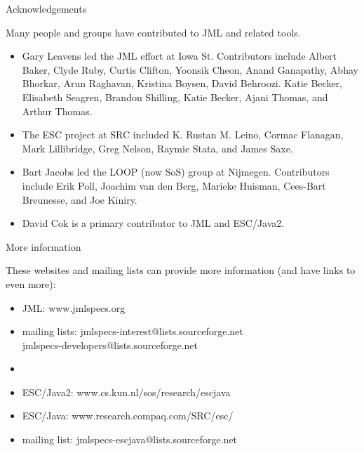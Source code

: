 \documentclass[
pdf,
nocolorBG,
slideColor,
erik,
]{prosper}
\begin{document}
\begin{slide}{Acknowledgements}

\vspace*{-2ex}
Many people and groups have contributed to JML and related tools.

\begin{itemize}
\item {\scriptsize Gary Leavens led the JML effort at Iowa St.
    Contributors include Albert Baker, Clyde Ruby, Curtis
    Clifton, Yoonsik Cheon, Anand Ganapathy, Abhay Bhorkar, Arun
    Raghavan, Kristina Boysen, David Behroozi. Katie Becker, Elisabeth
    Seagren, Brandon Shilling, Katie Becker, Ajani Thomas, and Arthur
    Thomas.}
\item {\scriptsize The ESC project at SRC included K. Rustan M.
    Leino, Cormac Flanagan, Mark Lillibridge, Greg Nelson, Raymie
    Stata, and James Saxe.}
\item {\scriptsize Bart Jacobs led the LOOP (now SoS) group at
    Nijmegen.  Contributors include Erik Poll, Joachim van den Berg,
    Marieke Huisman, Cees-Bart Breunesse, and Joe Kiniry.}
\item {\scriptsize David Cok is a primary contributor to JML and
    ESC/Java2.}
\end{itemize}
  
\end{slide}

\begin{slide}{More information}

\vspace*{-2ex}
These websites and mailing lists can provide more information (and have links to even more):

\begin{itemize}

\item JML: www.jmlspecs.org
\item mailing lists:  jmlspecs-interest@lists.sourceforge.net\\
jmlspecs-developers@lists.sourceforge.net 

\item[]
\item ESC/Java2:  www.cs.kun.nl/sos/research/escjava
\item ESC/Java:    www.research.compaq.com/SRC/esc/
\item mailing list:  jmlspecs-escjava@lists.sourceforge.net

\end{itemize}
  
\end{slide}
\end{document}
